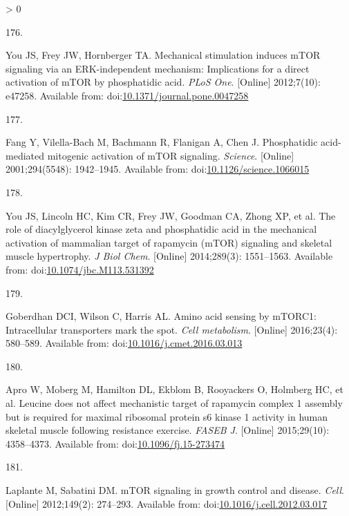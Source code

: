 \documentclass[twoside,10pt]{gihclass} %
\newlength{\cslhangindent}
\newlength{\csllabelwidth}
\newenvironment{CSLReferences}[3] %
 {%
  \setlength{\parindent}{0pt}
  \ifodd #1 \everypar{\setlength{\hangindent}{\cslhangindent}}\ignorespaces\fi
  \ifnum #2 > 0
  \setlength{\parskip}{#2\baselineskip}
  \fi
 }%
 {}
\newcommand{\CSLLeftMargin}[1]{\parbox[t]{\maxof{\widthof{#1}}{\csllabelwidth}}{#1}}
\newcommand{\CSLRightInline}[1]{\parbox[t]{\linewidth}{#1}}
\begin{document}
\begin{CSLReferences}{0}{0}
\leavevmode\hypertarget{ref-RN2119}{}%
\CSLLeftMargin{176. }
\CSLRightInline{You JS, Frey JW, Hornberger TA. Mechanical stimulation induces mTOR signaling via an ERK-independent mechanism: Implications for a direct activation of mTOR by phosphatidic acid. \emph{PLoS One}. {[}Online{]} 2012;7(10): e47258. Available from: doi:\href{https://doi.org/10.1371/journal.pone.0047258}{10.1371/journal.pone.0047258}}

\leavevmode\hypertarget{ref-RN2126}{}%
\CSLLeftMargin{177. }
\CSLRightInline{Fang Y, Vilella-Bach M, Bachmann R, Flanigan A, Chen J. Phosphatidic acid-mediated mitogenic activation of mTOR signaling. \emph{Science}. {[}Online{]} 2001;294(5548): 1942--1945. Available from: doi:\href{https://doi.org/10.1126/science.1066015}{10.1126/science.1066015}}

\leavevmode\hypertarget{ref-RN1728}{}%
\CSLLeftMargin{178. }
\CSLRightInline{You JS, Lincoln HC, Kim CR, Frey JW, Goodman CA, Zhong XP, et al. The role of diacylglycerol kinase zeta and phosphatidic acid in the mechanical activation of mammalian target of rapamycin (mTOR) signaling and skeletal muscle hypertrophy. \emph{J Biol Chem}. {[}Online{]} 2014;289(3): 1551--1563. Available from: doi:\href{https://doi.org/10.1074/jbc.M113.531392}{10.1074/jbc.M113.531392}}

\leavevmode\hypertarget{ref-RN2848}{}%
\CSLLeftMargin{179. }
\CSLRightInline{Goberdhan DCI, Wilson C, Harris AL. Amino acid sensing by mTORC1: Intracellular transporters mark the spot. \emph{Cell metabolism}. {[}Online{]} 2016;23(4): 580--589. Available from: doi:\href{https://doi.org/10.1016/j.cmet.2016.03.013}{10.1016/j.cmet.2016.03.013}}

\leavevmode\hypertarget{ref-RN1641}{}%
\CSLLeftMargin{180. }
\CSLRightInline{Apro W, Moberg M, Hamilton DL, Ekblom B, Rooyackers O, Holmberg HC, et al. Leucine does not affect mechanistic target of rapamycin complex 1 assembly but is required for maximal ribosomal protein s6 kinase 1 activity in human skeletal muscle following resistance exercise. \emph{FASEB J}. {[}Online{]} 2015;29(10): 4358--4373. Available from: doi:\href{https://doi.org/10.1096/fj.15-273474}{10.1096/fj.15-273474}}

\leavevmode\hypertarget{ref-RN2139}{}%
\CSLLeftMargin{181. }
\CSLRightInline{Laplante M, Sabatini DM. mTOR signaling in growth control and disease. \emph{Cell}. {[}Online{]} 2012;149(2): 274--293. Available from: doi:\href{https://doi.org/10.1016/j.cell.2012.03.017}{10.1016/j.cell.2012.03.017}}


\end{CSLReferences}
\end{document}
